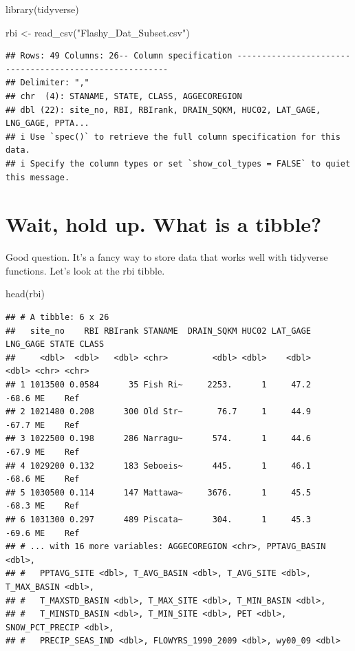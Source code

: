 \documentclass[
]{book}
\newenvironment{Shaded}{\begin{snugshade}}{\end{snugshade}}
\newcommand{\FunctionTok}[1]{\textcolor[rgb]{0.00,0.00,0.00}{#1}}
\newcommand{\NormalTok}[1]{#1}
\newcommand{\OtherTok}[1]{\textcolor[rgb]{0.56,0.35,0.01}{#1}}
\newcommand{\StringTok}[1]{\textcolor[rgb]{0.31,0.60,0.02}{#1}}
\begin{document}
\begin{Shaded}
\begin{Highlighting}[]
\FunctionTok{library}\NormalTok{(tidyverse)}

\NormalTok{rbi }\OtherTok{\textless{}{-}} \FunctionTok{read\_csv}\NormalTok{(}\StringTok{"Flashy\_Dat\_Subset.csv"}\NormalTok{)}
\end{Highlighting}
\end{Shaded}

\begin{verbatim}
## Rows: 49 Columns: 26-- Column specification --------------------------------------------------------
## Delimiter: ","
## chr  (4): STANAME, STATE, CLASS, AGGECOREGION
## dbl (22): site_no, RBI, RBIrank, DRAIN_SQKM, HUC02, LAT_GAGE, LNG_GAGE, PPTA...
## i Use `spec()` to retrieve the full column specification for this data.
## i Specify the column types or set `show_col_types = FALSE` to quiet this message.
\end{verbatim}

\hypertarget{wait-hold-up.-what-is-a-tibble}{%
\section{Wait, hold up. What is a tibble?}\label{wait-hold-up.-what-is-a-tibble}}

Good question. It's a fancy way to store data that works well with tidyverse functions. Let's look at the rbi tibble.

\begin{Shaded}
\begin{Highlighting}[]
\FunctionTok{head}\NormalTok{(rbi)}
\end{Highlighting}
\end{Shaded}

\begin{verbatim}
## # A tibble: 6 x 26
##   site_no    RBI RBIrank STANAME  DRAIN_SQKM HUC02 LAT_GAGE LNG_GAGE STATE CLASS
##     <dbl>  <dbl>   <dbl> <chr>         <dbl> <dbl>    <dbl>    <dbl> <chr> <chr>
## 1 1013500 0.0584      35 Fish Ri~     2253.      1     47.2    -68.6 ME    Ref  
## 2 1021480 0.208      300 Old Str~       76.7     1     44.9    -67.7 ME    Ref  
## 3 1022500 0.198      286 Narragu~      574.      1     44.6    -67.9 ME    Ref  
## 4 1029200 0.132      183 Seboeis~      445.      1     46.1    -68.6 ME    Ref  
## 5 1030500 0.114      147 Mattawa~     3676.      1     45.5    -68.3 ME    Ref  
## 6 1031300 0.297      489 Piscata~      304.      1     45.3    -69.6 ME    Ref  
## # ... with 16 more variables: AGGECOREGION <chr>, PPTAVG_BASIN <dbl>,
## #   PPTAVG_SITE <dbl>, T_AVG_BASIN <dbl>, T_AVG_SITE <dbl>, T_MAX_BASIN <dbl>,
## #   T_MAXSTD_BASIN <dbl>, T_MAX_SITE <dbl>, T_MIN_BASIN <dbl>,
## #   T_MINSTD_BASIN <dbl>, T_MIN_SITE <dbl>, PET <dbl>, SNOW_PCT_PRECIP <dbl>,
## #   PRECIP_SEAS_IND <dbl>, FLOWYRS_1990_2009 <dbl>, wy00_09 <dbl>
\end{verbatim}
\end{document}
